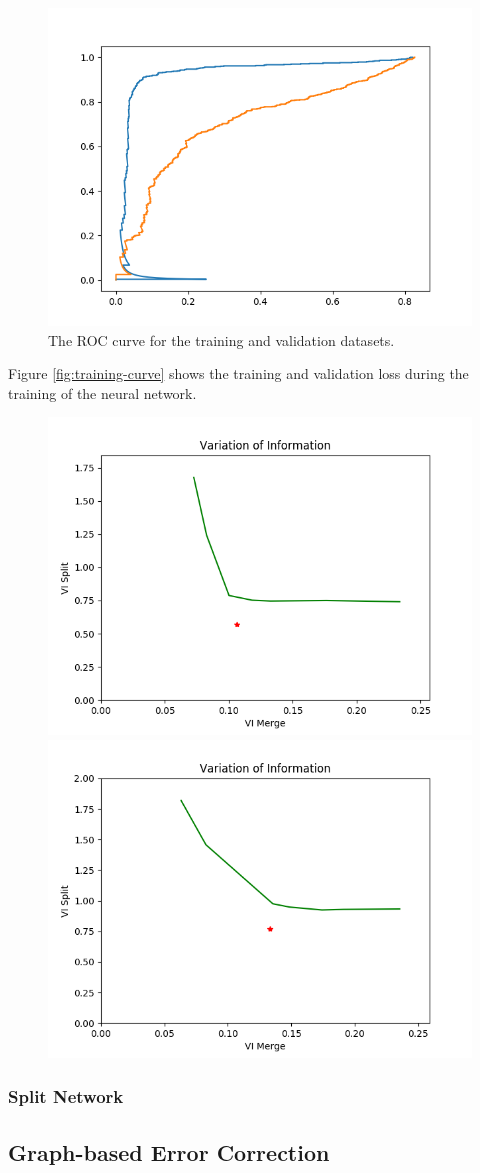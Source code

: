 \begin{figure}
	\includegraphics[width=0.85\linewidth]{figures/roc-microns-300-test.png}
	\caption{The ROC curve for the training and validation datasets.}
	\label{fig:roc-curve}
\end{figure}

Figure \ref{fig:training-curve} shows the training and validation loss during the training of the neural network.

\begin{figure}[t]
	\includegraphics[width=0.45\linewidth]{figures/variation_of_information-train.png}
	\hspace{0.0825\linewidth}
	\includegraphics[width=0.45\linewidth]{figures/variation_of_information-test.png}	
\end{figure}

\subsubsection{Split Network}



\subsection{Graph-based Error Correction}